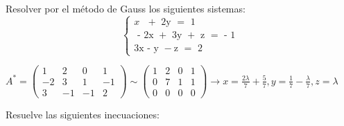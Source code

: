 \documentclass[addpoints,spanish, 12pt,a4paper]{exam}
\begin{document}
\begin{questions}

\question[8] Resolver por el método de Gauss los siguientes sistemas:
		$$\left\{ {\begin{array}{*{20}{c}}
  {x{\text{ }} + {\text{ 2y     }} = {\text{  1}}} \\ 
  {{\text{ - 2x }} + {\text{ 3y }} + {\text{ z }} = {\text{  - 1}}} \\ 
  {{\text{3x  -  y  }} - {\text{z }} = {\text{ 2}}} 
\end{array} } \right.$$
\begin{solution}
$A^*=\left(\begin{matrix}1 & 2 & 0 & 1\\-2 & 3 & 1 & -1\\3 & -1 & -1 & 2\end{matrix}\right)\sim\left(\begin{matrix}1 & 2 & 0 & 1\\0 & 7 & 1 & 1\\0 & 0 & 0 & 0\end{matrix}\right)\to x=\frac{2 \lambda}{7} + \frac{5}{7}, y=\frac{1}{7} - \frac{\lambda}{7}, z=\lambda$ \\

\end{solution}
\question[10] Resuelve las siguientes inecuaciones:
\begin{parts}
    \part $\dfrac{{{\text{3}}\cdot{\text{(x - 1)}}}}{{\text{2}}}{\text{  -  4x }} < {\text{ 1  -  }}\left( {{\text{x }} + {\text{ }}\frac{{\text{1}}}{{\text{2}}}} \right)$
    \begin{solution}
        $-3x < 4 \to (-\frac{4}{3}, \ \infty)$
    \end{solution}
    \part $\dfrac{{{x^2} - 25}}{{{x^2} - 7x + 10}}{\text{ }} \leqslant {\text{ 0 }}$
    \begin{solution}
        $ \dfrac{(x+5)(x-5)}{(x-5)(x-2)}\leqslant0  \to [-5, \ 2)$
    \end{solution}
\end{parts}


\end{questions}
\end{document}
